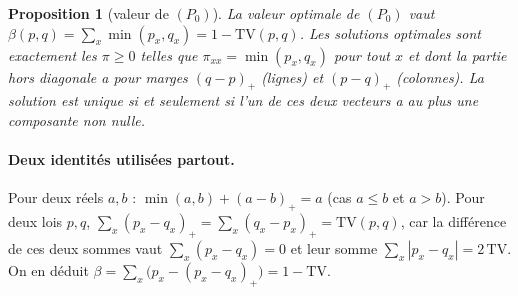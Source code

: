 \documentclass[11pt,a4paper]{article}
\newcommand{\TV}{\mathrm{TV}}
\theoremstyle{plain}
\newtheorem{proposition}{Proposition}
\theoremstyle{definition}
\begin{document}
\begin{proposition}[valeur de $(P_0)$]\label{prop:valeur}
La valeur optimale de $(P_0)$ vaut $\beta(p,q)=\sum_x\min(p_x,q_x)=1-\TV(p,q)$.
Les solutions optimales sont exactement les $\pi\ge0$ telles que $\pi_{xx}=\min(p_x,q_x)$ pour tout $x$ et dont la partie hors diagonale a pour marges $(q-p)_+$ (lignes) et $(p-q)_+$ (colonnes).
La solution est unique si et seulement si l'un de ces deux vecteurs a au plus une composante non nulle.
\end{proposition}

\paragraph{Deux identités utilisées partout.} Pour deux réels $a,b$ : $\min(a,b)+(a-b)_+=a$ (cas $a\le b$ et $a>b$). Pour deux lois $p,q$, $\sum_x(p_x-q_x)_+=\sum_x(q_x-p_x)_+=\TV(p,q)$, car la différence de ces deux sommes vaut $\sum_x(p_x-q_x)=0$ et leur somme $\sum_x|p_x-q_x|=2\,\TV$. On en déduit $\beta=\sum_x\big(p_x-(p_x-q_x)_+\big)=1-\TV$.
\end{document}
